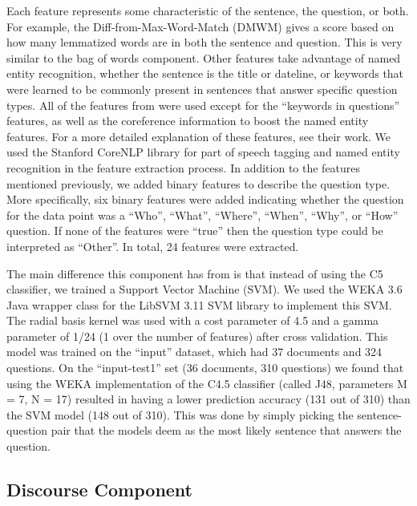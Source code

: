 \documentclass[11pt,letterpaper]{article}
\begin{document}
Each feature represents some characteristic of the sentence, the
question, or both.  For example, the Diff-from-Max-Word-Match (DMWM)
gives a score based on how many lemmatized words are in both the
sentence and question.  This is very similar to the bag of words
component.  Other features take advantage of named entity recognition,
whether the sentence is the title or dateline, or keywords that were
learned to be commonly present in sentences that answer specific
question types.  All of the features from \cite{Ng00amachine} were
used except for the ``keywords in questions'' features, as well as the
coreference information to boost the named entity features.  For a
more detailed explanation of these features, see their work.  We used
the Stanford CoreNLP library for part of speech tagging
\cite{Toutanova00enrichingthe} and named entity recognition
\cite{Finkel05incorporatingnon-local} in the feature extraction
process.  In addition to the features mentioned previously, we added
binary features to describe the question type.  More specifically, six
binary features were added indicating whether the question for the
data point was a ``Who'', ``What'', ``Where'', ``When'', ``Why'', or
``How'' question.  If none of the features were ``true'' then the
question type could be interpreted as ``Other''.   In total, 24
features were extracted.

The main difference this component has from \cite{Ng00amachine} is
that instead of using the C5 classifier, we trained a Support Vector
Machine (SVM).  We used the WEKA 3.6 \cite{Hall_theweka} Java wrapper
class for the LibSVM 3.11 \cite{Chang01libsvm:a} SVM library to
implement this SVM.  The radial basis kernel was used with a cost
parameter of 4.5 and a gamma parameter of 1/24 (1 over the number of
features) after cross validation.   This model was trained on the
``input'' dataset, which had 37 documents and 324 questions.  On the
``input-test1'' set (36 documents, 310 questions) we found that using
the WEKA implementation of the C4.5 classifier (called J48,
parameters M = 7, N = 17) resulted in having a lower prediction
accuracy (131 out of 310) than the SVM model (148 out of 310).  This was
done by simply picking the sentence-question pair that the models deem as
the most likely sentence that answers the question. 



\subsection{Discourse Component}
\end{document}
